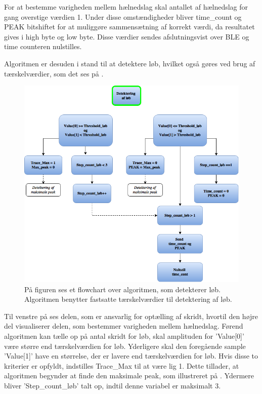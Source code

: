 For at bestemme varigheden mellem hælnedslag skal antallet af hælnedslag for gang overstige værdien 1. Under disse omstændigheder bliver time\_count og PEAK bitshiftet for at muliggøre sammensætning af korrekt værdi, da resultatet gives i high byte og low byte. Disse værdier sendes afslutningsvist over BLE og time counteren nulstilles.

Algoritmen er desuden i stand til at detektere løb, hvilket også gøres ved brug af tærskelværdier, som det ses på .
\begin{figure}[H]
	\centering
	\includegraphics[scale=0.5]{figures/cDesign/loeb_ckode_pseudo.png}
	\caption{På figuren ses et flowchart over algoritmen, som detekterer løb. Algoritmen benytter fastsatte tærskelværdier til detektering af løb.}
	\label{fig:loeb_pseudo}
\end{figure}\vspace{-0.25cm}
Til venstre på  ses delen, som er ansvarlig for optælling af skridt, hvortil den højre del visualiserer delen, som bestemmer varigheden mellem hælnedslag. Førend algoritmen kan tælle op på antal skridt for løb, skal amplituden for 'Value[0]' være større end tærskelværdien for løb. Yderligere skal den foregående sample 'Value[1]' have en størrelse, der er lavere end tærskelværdien for løb. Hvis disse to kriterier er opfyldt, indstilles Trace\_Max til at være lig 1. Dette tillader, at algoritmen begynder at finde den maksimale peak, som illustreret på . Ydermere bliver 'Step\_count\_løb' talt op, indtil denne variabel er maksimalt 3. \\
